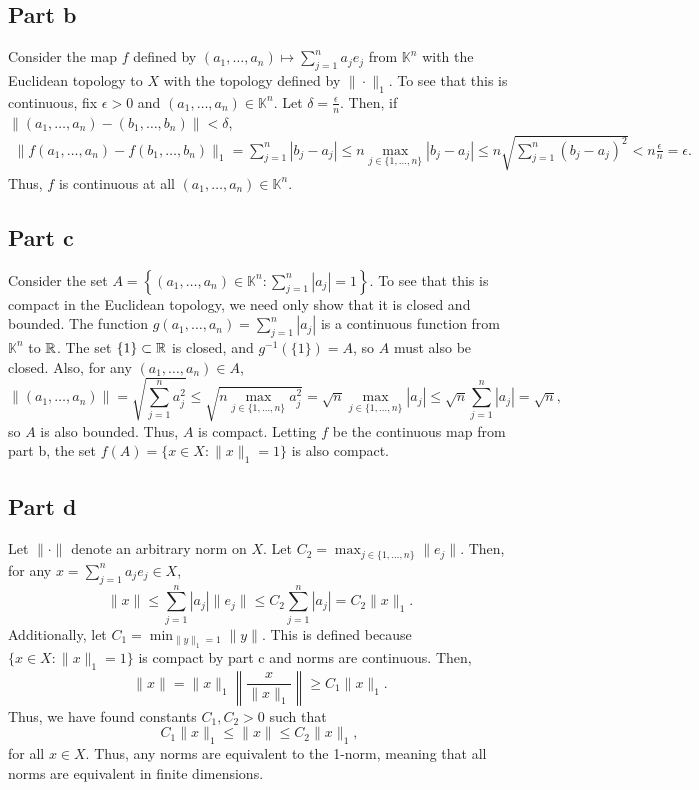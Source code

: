 \documentclass{article}
\begin{document}
\subsection{Part b}
Consider the map $f$ defined by $(a_1,\ldots,a_n)\mapsto\sum_{j=1}^na_je_j$ from $\mathbb{K}^n$ with the Euclidean topology to $X$ with the topology defined by $\|\cdot\|_1$. To see that this is continuous, fix $\epsilon>0$ and $(a_1,\ldots,a_n)\in\mathbb{K}^n$. Let $\delta=\frac{\epsilon}{n}$. Then, if $\|(a_1,\ldots,a_n)-(b_1,\ldots,b_n)\|<\delta$,
\begin{align*}
\|f(a_1,\ldots,a_n)-f(b_1,\ldots,b_n)\|_1=\sum_{j=1}^n|b_j-a_j|\leq n\max_{j\in\{1,\ldots,n\}}|b_j-a_j|\leq n\sqrt{\sum_{j=1}^n(b_j-a_j)^2}<n\frac{\epsilon}{n}=\epsilon.
\end{align*}
Thus, $f$ is continuous at all $(a_1,\ldots,a_n)\in\mathbb{K}^n$. 

\subsection{Part c}
Consider the set $A=\left\{(a_1,\ldots,a_n)\in \mathbb{K}^n:\sum_{j=1}^{n}|a_j|=1\right\}$. To see that this is compact in the Euclidean topology, we need only show that it is closed and bounded. The function $g(a_1,\ldots,a_n)=\sum_{j=1}^{n}|a_j|$ is a continuous function from $\mathbb{K}^n$ to $\mathbb{R}$. The set $\{1\}\subset\mathbb{R}$ is closed, and $g^{-1}(\{1\})=A$, so $A$ must also be closed. Also, for any $(a_1,\ldots,a_n)\in A$, 
\[
\|(a_1,\ldots,a_n)\|=\sqrt{\sum_{j=1}^n a_j^2}\leq\sqrt{n\max_{j\in\{1,\ldots,n\}}a_j^2}=\sqrt{n}\max_{j\in\{1,\ldots,n\}}|a_j|\leq\sqrt{n}\sum_{j=1}^{n}|a_j|=\sqrt{n},
\]
so $A$ is also bounded. Thus, $A$ is compact. Letting $f$ be the continuous map from part b, the set $f(A)=\{x\in X:\|x\|_1=1\}$ is also compact.

\subsection{Part d}
Let $\|\cdot\|$ denote an arbitrary norm on $X$. Let $C_2=\max_{j\in\{1,\ldots,n\}}\|e_j\|$. Then, for any $x=\sum_{j=1}^na_je_j\in X$, 
\[
\|x\|\leq\sum_{j=1}^n|a_j|\|e_j\|\leq C_2\sum_{j=1}^n|a_j|=C_2\|x\|_1.
\]
Additionally, let $C_1=\min_{\|y\|_1=1}\|y\|$. This is defined because $\{x\in X:\|x\|_1=1\}$ is compact by part c and norms are continuous. Then,
\[
\|x\|=\|x\|_1\left\|\frac{x}{\|x\|_1}\right\|\geq C_1\|x\|_1.
\]
Thus, we have found constants $C_1,C_2>0$ such that
\[
C_1\|x\|_1\leq \|x\|\leq C_2\|x\|_1,
\]
for all $x\in X$. Thus, any norms are equivalent to the 1-norm, meaning that all norms are equivalent in finite dimensions. 
\end{document}

